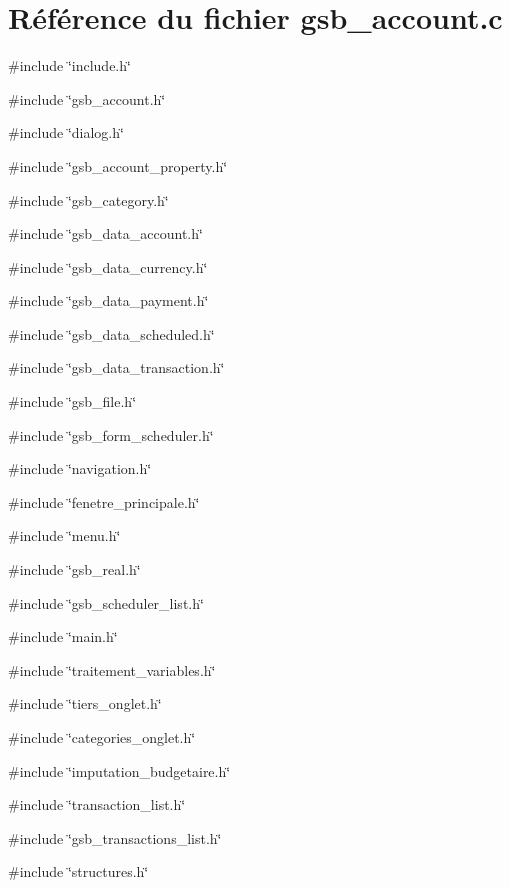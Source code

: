 \section{Référence du fichier gsb\_\-account.c}
\label{gsb__account_8c}
{\ttfamily \#include \char`\"{}include.h\char`\"{}}\par
{\ttfamily \#include \char`\"{}gsb\_\-account.h\char`\"{}}\par
{\ttfamily \#include \char`\"{}dialog.h\char`\"{}}\par
{\ttfamily \#include \char`\"{}gsb\_\-account\_\-property.h\char`\"{}}\par
{\ttfamily \#include \char`\"{}gsb\_\-category.h\char`\"{}}\par
{\ttfamily \#include \char`\"{}gsb\_\-data\_\-account.h\char`\"{}}\par
{\ttfamily \#include \char`\"{}gsb\_\-data\_\-currency.h\char`\"{}}\par
{\ttfamily \#include \char`\"{}gsb\_\-data\_\-payment.h\char`\"{}}\par
{\ttfamily \#include \char`\"{}gsb\_\-data\_\-scheduled.h\char`\"{}}\par
{\ttfamily \#include \char`\"{}gsb\_\-data\_\-transaction.h\char`\"{}}\par
{\ttfamily \#include \char`\"{}gsb\_\-file.h\char`\"{}}\par
{\ttfamily \#include \char`\"{}gsb\_\-form\_\-scheduler.h\char`\"{}}\par
{\ttfamily \#include \char`\"{}navigation.h\char`\"{}}\par
{\ttfamily \#include \char`\"{}fenetre\_\-principale.h\char`\"{}}\par
{\ttfamily \#include \char`\"{}menu.h\char`\"{}}\par
{\ttfamily \#include \char`\"{}gsb\_\-real.h\char`\"{}}\par
{\ttfamily \#include \char`\"{}gsb\_\-scheduler\_\-list.h\char`\"{}}\par
{\ttfamily \#include \char`\"{}main.h\char`\"{}}\par
{\ttfamily \#include \char`\"{}traitement\_\-variables.h\char`\"{}}\par
{\ttfamily \#include \char`\"{}tiers\_\-onglet.h\char`\"{}}\par
{\ttfamily \#include \char`\"{}categories\_\-onglet.h\char`\"{}}\par
{\ttfamily \#include \char`\"{}imputation\_\-budgetaire.h\char`\"{}}\par
{\ttfamily \#include \char`\"{}transaction\_\-list.h\char`\"{}}\par
{\ttfamily \#include \char`\"{}gsb\_\-transactions\_\-list.h\char`\"{}}\par
{\ttfamily \#include \char`\"{}structures.h\char`\"{}}\par
